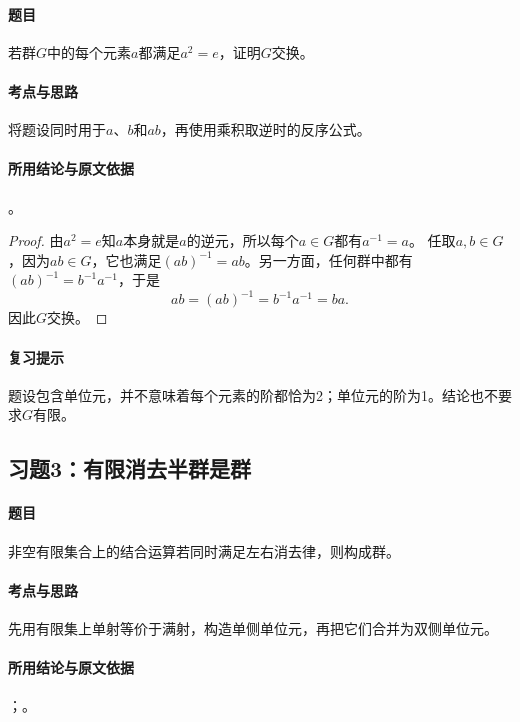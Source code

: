 \paragraph{题目}
若群$G$中的每个元素$a$都满足$a^2=e$，证明$G$交换。

\paragraph{考点与思路}
将题设同时用于$a$、$b$和$ab$，再使用乘积取逆时的反序公式。

\paragraph{所用结论与原文依据}
。


\begin{proof}
由$a^2=e$知$a$本身就是$a$的逆元，所以每个$a\in G$都有$a^{-1}=a$。
任取$a,b\in G$，因为$ab\in G$，它也满足$(ab)^{-1}=ab$。另一方面，任何群中都有$(ab)^{-1}=b^{-1}a^{-1}$，于是
\[
ab=(ab)^{-1}=b^{-1}a^{-1}=ba.
\]
因此$G$交换。
\end{proof}

\paragraph{复习提示}
题设包含单位元，并不意味着每个元素的阶都恰为2；单位元的阶为1。结论也不要求$G$有限。


\subsection{习题3：\texorpdfstring{有限消去半群是群}{有限消去半群是群}}
\label{ex:1:3}

\paragraph{题目}
非空有限集合上的结合运算若同时满足左右消去律，则构成群。

\paragraph{考点与思路}
先用有限集上单射等价于满射，构造单侧单位元，再把它们合并为双侧单位元。

\paragraph{所用结论与原文依据}
；。


